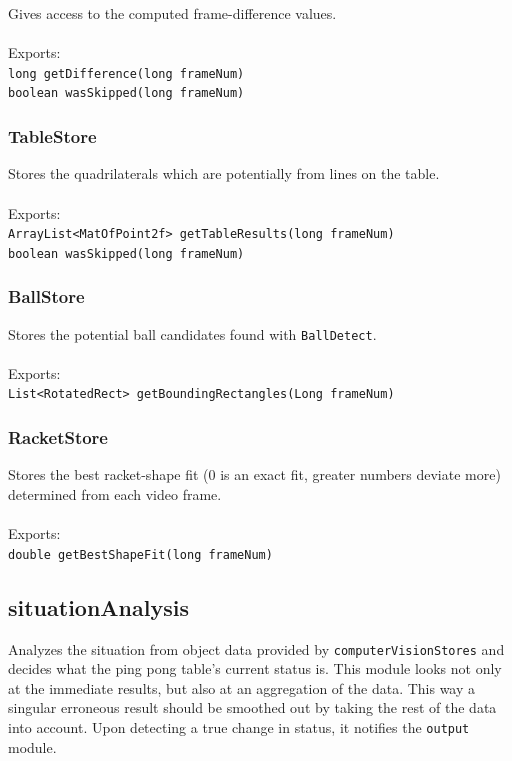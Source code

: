 \documentclass[11pt]{report}
\begin{document}
Gives access to the computed frame-difference values.\\
\\
Exports:\\
\texttt{long getDifference(long frameNum)}\\
\texttt{boolean wasSkipped(long frameNum)}

\subsubsection{TableStore}

Stores the quadrilaterals which are potentially from lines on the table.\\
\\
Exports:\\
\texttt{ArrayList<MatOfPoint2f> getTableResults(long frameNum)}\\
\texttt{boolean wasSkipped(long frameNum)}

\subsubsection{BallStore}

Stores the potential ball candidates found with \texttt{BallDetect}.\\
\\
Exports:\\
\texttt{List<RotatedRect> getBoundingRectangles(Long frameNum)}

\subsubsection{RacketStore}

Stores the best racket-shape fit (0 is an exact fit, greater numbers deviate more) determined from each video frame.\\
\\
Exports:\\
\texttt{double getBestShapeFit(long frameNum)}

\subsection{situationAnalysis}

Analyzes the situation from object data provided by \texttt{computerVisionStores} and decides what the ping pong table's current status is.  This module looks not only at the immediate results, but also at an aggregation of the data.  This way a singular erroneous result should be smoothed out by taking the rest of the data into account.  Upon detecting a true change in status, it notifies the \texttt{output} module.
\end{document}

